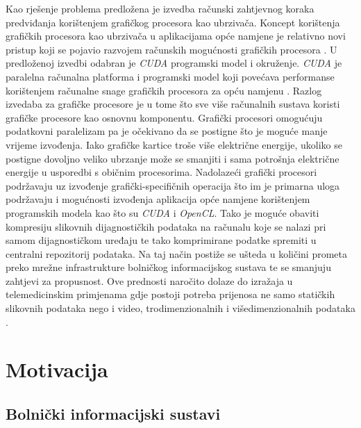 \documentclass[times, utf8, zavrsni, numeric, sort]{fer}
\begin{document}
Kao rješenje problema predložena je izvedba računski zahtjevnog koraka predviđanja korištenjem grafičkog procesora kao ubrzivača. Koncept korištenja grafičkih procesora kao ubrzivača u aplikacijama opće namjene je relativno novi pristup koji se pojavio razvojem računskih mogućnosti grafičkih procesora \cite{gpgpu, Owens:07, CUDAHOME, openclhome}.  U predloženoj izvedbi odabran je \emph{CUDA} programski model i okruženje. \emph{CUDA} je paralelna računalna platforma i programski model koji povećava performanse korištenjem računalne snage grafičkih procesora za opću namjenu \cite{CUDAHOME}. Razlog izvedaba za grafičke procesore je u tome što sve više računalnih sustava koristi grafičke procesore kao osnovnu komponentu. Grafički procesori omogućuju podatkovni paralelizam pa je očekivano da se postigne što je moguće manje vrijeme izvođenja. Iako grafičke kartice troše više električne energije, ukoliko se postigne dovoljno veliko ubrzanje može se smanjiti i sama potrošnja električne energije u usporedbi s običnim procesorima. Nadolazeći grafički procesori podržavaju uz izvođenje grafički-specifičnih operacija što im je primarna uloga podržavaju i mogućnosti izvođenja aplikacija opće namjene korištenjem programskih modela kao što su \emph{CUDA} i \emph{OpenCL}. Tako je moguće obaviti kompresiju slikovnih dijagnostičkih podataka na računalu koje se nalazi pri samom dijagnostičkom uređaju te tako komprimirane podatke spremiti u centralni repozitorij podataka. Na taj način postiže se ušteda u količini prometa preko mrežne infrastrukture bolničkog informacijskog sustava te se smanjuju zahtjevi za propusnost. Ove prednosti naročito dolaze do izražaja u telemedicinskim primjenama gdje postoji potreba prijenosa ne samo statičkih slikovnih podataka nego i video, trodimenzionalnih i višedimenzionalnih podataka \cite{Klapan:06, Sruk:02}.



\chapter{Motivacija}
\section{Bolnički informacijski sustavi}
\end{document}
